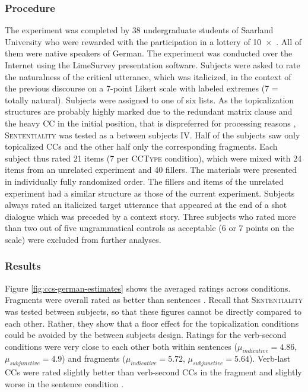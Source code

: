 \subsubsection{Procedure}\label{sec:ccs-german-method}
The experiment was completed by 38 undergraduate students of Saarland University who were rewarded with the participation in a lottery of 10~$\times$~. All of them were native speakers of German. The experiment was conducted over the Internet using the LimeSurvey presentation software. Subjects were asked to rate the naturalness of the critical utterance, which was italicized, in the context of the previous discourse on a 7-point Likert scale with labeled extremes (7 = totally natural). Subjects were assigned to one of six lists. As the topicalization structures are probably highly marked due to the redundant matrix clause and the heavy CC in the initial position, that is dispreferred for processing reasons \citep{hawkins2004}, \textsc{Sententiality} was tested as a between subjects IV. Half of the subjects saw only topicalized CCs and the other half only the corresponding fragments. Each subject thus rated 21 items (7 per \textsc{CCType} condition), which were mixed with 24 items from an unrelated experiment and 40 fillers. The materials were presented in individually fully randomized order. The fillers and items of the unrelated experiment had a similar structure as those of the current experiment. Subjects always rated an italicized target utterance that appeared at the end of a shot dialogue which was preceded by a context story. Three subjects who rated more than two out of five ungrammatical controls as acceptable (6 or 7 points on the scale) were excluded from further analyses.

\subsubsection{Results}\label{sec:ccs-german-results}

Figure \ref{fig:ccs-german-estimates} shows the averaged ratings across conditions. Fragments  were overall rated as better than sentences .  Recall that \textsc{Sententiality} was tested between subjects, so that these figures cannot be directly compared to each other. Rather, they show that a floor effect for the topicalization conditions could be avoided by the between subjects design. Ratings for the verb-second conditions were very close to each other both within sentences ($\mu_{indicative} = 4.86$, $\mu_{subjunctive} = 4.9$) and fragments ($\mu_{indicative} = 5.72$, $\mu_{subjunctive} = 5.64$). Verb-last CCs were rated slightly better than verb-second CCs in the fragment  and slightly worse in the sentence condition . 

